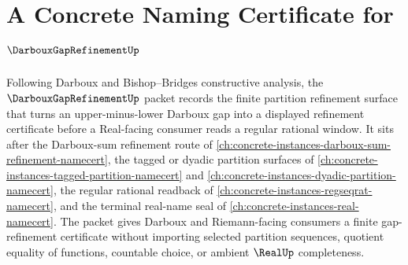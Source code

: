 \chapter{A Concrete Naming Certificate for $\DarbouxGapRefinementUp$}
\label{ch:concrete-instances-darboux-gap-refinement-namecert}

Following Darboux and Bishop--Bridges constructive analysis, the $\DarbouxGapRefinementUp$ packet records the finite partition refinement surface that turns an upper-minus-lower Darboux gap into a displayed refinement certificate before a Real-facing consumer reads a regular rational window. It sits after the Darboux-sum refinement route of \autoref{ch:concrete-instances-darboux-sum-refinement-namecert}, the tagged or dyadic partition surfaces of \autoref{ch:concrete-instances-tagged-partition-namecert} and \autoref{ch:concrete-instances-dyadic-partition-namecert}, the regular rational readback of \autoref{ch:concrete-instances-regseqrat-namecert}, and the terminal real-name seal of \autoref{ch:concrete-instances-real-namecert}. The packet gives Darboux and Riemann-facing consumers a finite gap-refinement certificate without importing selected partition sequences, quotient equality of functions, countable choice, or ambient $\RealUp$ completeness.

